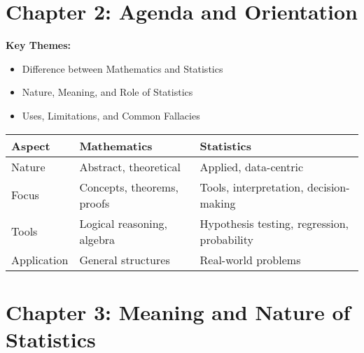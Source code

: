 \documentclass[
  letterpaper,
  DIV=11,
  numbers=noendperiod]{scrreprt}
\providecommand{\tightlist}{%
  \setlength{\itemsep}{0pt}\setlength{\parskip}{0pt}}
\begin{document}

\chapter{Chapter 2: Agenda and
Orientation}\label{chapter-2-agenda-and-orientation}

\textbf{Key Themes:}

\begin{itemize}
\tightlist
\item
  Difference between Mathematics and Statistics\\
\item
  Nature, Meaning, and Role of Statistics\\
\item
  Uses, Limitations, and Common Fallacies
\end{itemize}

\begin{longtable}[]{@{}
  >{\raggedright\arraybackslash}p{}
  >{\raggedright\arraybackslash}p{}
  >{\raggedright\arraybackslash}p{}@{}}
\toprule\noalign{}
\begin{minipage}[b]{\linewidth}\raggedright
Aspect
\end{minipage} & \begin{minipage}[b]{\linewidth}\raggedright
Mathematics
\end{minipage} & \begin{minipage}[b]{\linewidth}\raggedright
Statistics
\end{minipage} \\
\midrule\noalign{}
\endhead
\bottomrule\noalign{}
\endlastfoot
Nature & Abstract, theoretical & Applied, data-centric \\
Focus & Concepts, theorems, proofs & Tools, interpretation,
decision-making \\
Tools & Logical reasoning, algebra & Hypothesis testing, regression,
probability \\
Application & General structures & Real-world problems \\
\end{longtable}


\chapter{Chapter 3: Meaning and Nature of
Statistics}\label{chapter-3-meaning-and-nature-of-statistics}
\end{document}
